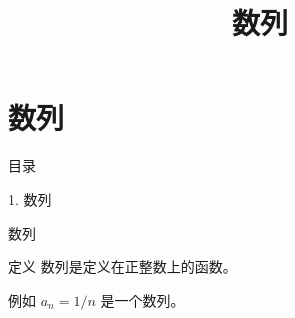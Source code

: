 \documentclass[aspectratio=169,10pt,fontset=fandol]{ctexbeamer}
\title{数列}
\begin{document}
\section{数列}
\begin{frame}[t,fragile]{目录}
\normalsize
{\color{blue}\normalsize 1. 数列\par}\vspace{0.3em}
\end{frame}
\begin{frame}[t,fragile]{数列}
\normalsize
\begin{block}{定义}
{\normalsize
数列是定义在正整数上的函数。
}
\end{block}
{\normalsize
例如 $a_n=1/n$ 是一个数列。
}
\end{frame}
\end{document}
